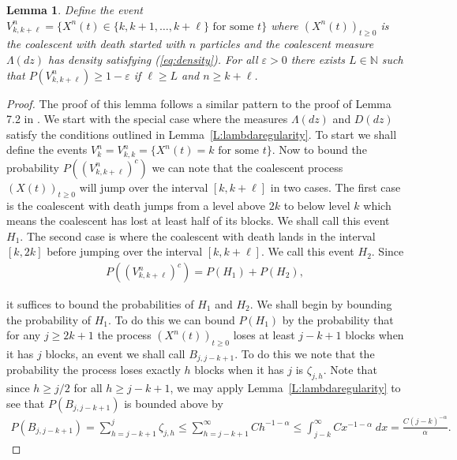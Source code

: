 \documentclass[11pt]{article}
\newtheorem{lemma}{Lemma}
\theoremstyle{definition}
\newcommand{\N}{\mathbb{N}}
\newcommand{\lemref}[1]{Lemma~\ref{L:#1}}
\begin{document}
\begin{lemma}\label{L:withinrange}
    Define the event $V_{k, k+\ell}^n = \{X^n(t) \in \{k, k+1, \ldots, k+ \ell\} \text{ for some $t$}\}$ where $(X^n(t))_{t \geq 0}$ is the coalescent with death started with $n$ particles and the coalescent measure $\Lambda(dz)$ has density satisfying \emph{(}\ref{eq:density}\emph{)}. For all $\varepsilon > 0$ there exists $L \in \N$ such that $P(V_{k, k+\ell}^n) \geq 1 - \varepsilon$ if $\ell \geq L$ and $n \geq k + \ell$.
\end{lemma}

\begin{proof}
    The proof of this lemma follows a similar pattern to the proof of Lemma 7.2 in \cite{betasmalltime}. We start with the special case where the measures $\Lambda(dz)$ and $D(dz)$ satisfy the conditions outlined in \lemref{lambdaregularity}. To start we shall define the events $V_k^n = V_{k,k}^n = \{X^n(t) =k \text{ for some $t$}\}$. Now to bound the probability $P((V_{k, k + \ell}^n)^c)$ we can note that the coalescent process $(X(t))_{t \geq 0}$ will jump over the interval $[k, k+\ell]$ in two cases. The first case is the coalescent with death jumps from a level above $2k$ to below level $k$ which means the coalescent has lost at least half of its blocks. We shall call this event $H_1$. The second case is where the coalescent with death lands in the interval $[k,2k]$ before jumping over the interval $[k, k+\ell]$. We call this event $H_2$. Since
    \begin{align*}
        P((V_{k,k+\ell}^n)^c) = P(H_1) + P(H_2),
    \end{align*}

    \noindent it suffices to bound the probabilities of $H_1$ and $H_2$. We shall begin by bounding the probability of $H_1$. To do this we can bound $P(H_1)$ by the probability that for any $j \geq 2k + 1$ the process $(X^n(t))_{t \geq 0}$ loses at least $j - k + 1$ blocks when it has $j$ blocks, an event we shall call $B_{j,j-k+1}$. To do this we note that the probability the process loses exactly $h$ blocks when it has $j$ is $\zeta_{j,h}$. Note that since $h \geq j/2$ for all $h \geq j-k+1$, we may apply \lemref{lambdaregularity} to see that $P(B_{j,j-k+1})$ is bounded above by
    \begin{align*}
        P(B_{j,j-k+1}) = \sum_{h = j-k+1}^j \zeta_{j,h} \leq  \sum_{h = j-k+1}^\infty Ch^{-1-\alpha} \leq \int_{j-k}^\infty Cx^{-1-\alpha}\;dx = \frac{C(j-k)^{-\alpha}}{\alpha}.
    \end{align*}
    

\end{proof}
\end{document}
